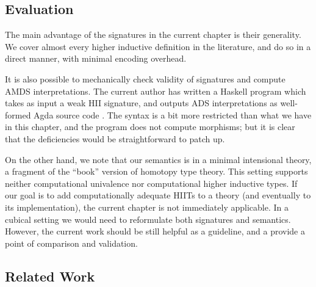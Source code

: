 \documentclass[12pt,a4paper,twoside,openany]{book}
\theoremstyle{remark}
\theoremstyle{definition}
\theoremstyle{theorem}
\begin{document}
\subsection{Evaluation}

The main advantage of the signatures in the current chapter is their generality.
We cover almost every higher inductive definition in the literature, and do so
in a direct manner, with minimal encoding overhead.

It is also possible to mechanically check validity of signatures and compute
AMDS interpretations. The current author has written a Haskell program which
takes as input a weak HII signature, and outputs ADS interpretations as
well-formed Agda source code \cite{hiit-sig-program}. The syntax is a bit more
restricted than what we have in this chapter, and the program does not compute
morphisms; but it is clear that the deficiencies would be straightforward to
patch up.

On the other hand, we note that our semantics is in a minimal intensional
theory, a fragment of the ``book'' version of homotopy type theory. This setting
supports neither computational univalence nor computational higher inductive
types. If our goal is to add computationally adequate HIITs to a theory (and
eventually to its implementation), the current chapter is not immediately
applicable. In a cubical setting we would need to reformulate both signatures
and semantics. However, the current work should be still helpful as a guideline,
and a provide a point of comparison and validation.


\subsection{Related Work}
\label{sec:hii-related-work}
\end{document}
